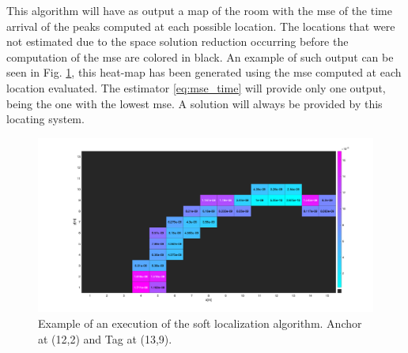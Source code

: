 This algorithm will have as output a map of the room with the \gls{mse} of the time arrival of the peaks computed at each possible location. The locations that were not estimated due to the space solution reduction occurring before the computation of the \gls{mse} are colored in black. An example of such output can be seen in Fig. \ref{fig:mse_example}, this heat-map has been generated using the \gls{mse} computed at each location evaluated. The estimator \ref{eq:mse_time} will provide only one output, being the one with the lowest \gls{mse}. A solution will always be provided by this locating system. 
\vspace{2mm}

\begin{figure}[H]
\centering
\includegraphics[width=\linewidth]{Images/mse_map_algo.png}
\caption{Example of an execution of the soft localization algorithm. Anchor at (12,2) and Tag at (13,9).\label{fig:mse_example}}
\end{figure}
